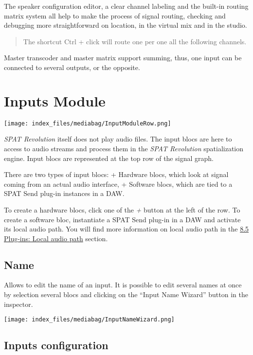 \documentclass[
  letterpaper,
  DIV=11,
  numbers=noendperiod]{scrreport}
\begin{document}
The speaker configuration editor, a clear channel labeling and the
built-in routing matrix system all help to make the process of signal
routing, checking and debugging more straightforward on location, in the
virtual mix and in the studio.

\begin{quote}
The shortcut Ctrl + click will route one per one all the following
channels.
\end{quote}

Master transcoder and master matrix support summing, thus, one input can
be connected to several outputs, or the opposite.

\hypertarget{inputs-module}{%
\chapter{Inputs Module}\label{inputs-module}}

\texttt{[image: index\_files/mediabag/InputModuleRow.png]}

\emph{SPAT Revolution} itself does not play audio files. The input blocs
are here to access to audio streams and process them in the \emph{SPAT
Revolution} spatialization engine. Input blocs are represented at the
top row of the signal graph.

There are two types of input blocs: + Hardware blocs, which look at
signal coming from an actual audio interface, + Software blocs, which
are tied to a SPAT Send plug-in instances in a DAW.

To create a hardware blocs, click one of the \emph{+} button at the left
of the row. To create a software bloc, instantiate a SPAT Send plug-in
in a DAW and activate its local audio path. You will find more
information on local audio path in the
\href{Ecosystem_\&_integration_DAW_Automation_Local_Audio_Path.md}{8.5
Plug-ins: Local audio path} section.

\hypertarget{name}{%
\section{Name}\label{name}}

Allows to edit the name of an input. It is possible to edit several
names at once by selection several blocs and clicking on the ``Input
Name Wizard'' button in the inspector.

\texttt{[image: index\_files/mediabag/InputNameWizard.png]}

\hypertarget{inputs-configuration}{%
\section{Inputs configuration}\label{inputs-configuration}}
\end{document}
